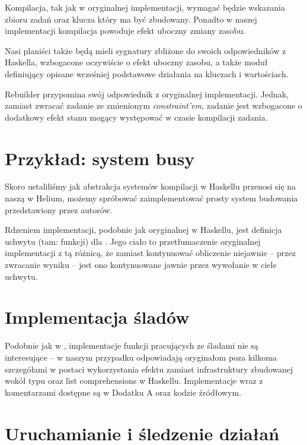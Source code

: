 Kompilacja, tak jak w oryginalnej implementacji, wymagać będzie wskazania zbioru zadań oraz klucza który ma być zbudowany. Ponadto w naszej implementacji kompilacja powoduje efekt uboczny zmiany zasobu.

Nasi planiści także będą mieli sygnatury zbliżone do swoich odpowiedników z Haskella, wzbogacone oczywiście o efekt uboczny zasobu, a także moduł definiujący opisane wcześniej podstawowe działania na kluczach i wartościach.



Rebuilder przypomina swój odpowiednik z oryginalnej implementacji. Jednak, zamiast zwracać zadanie ze zmienionym \textit{constraint'em}, zadanie jest wzbogacone o dodatkowy efekt stanu mogący występować w czasie kompilacji zadania.

\section{Przykład: system busy}

Skoro ustaliliśmy jak abstrakcja systemów kompilacji w Haskellu przenosi się na naszą w Helium, możemy spróbować zaimplementować prosty system budowania  przedstawiony przez autorów.



Rdzeniem implementacji, podobnie jak oryginalnej w Haskellu, jest definicja uchwytu (tam: funkcji) dla . Jego ciało to przetłumaczenie oryginalnej implementacji z tą różnicą, że zamiast kontynuować obliczenie niejawnie -- przez zwracanie wyniku -- jest ono kontynuowane jawnie przez wywołanie  w ciele uchwytu.

\section{Implementacja śladów}

Podobnie jak w \BSaLC{}, implementacje funkcji pracujących ze śladami nie są interesujące -- w naszym przypadku odpowiadają oryginałom poza kilkoma szczegółami w postaci wykorzystania efektu  zamiast infrastruktury zbudowanej wokół typu  oraz list comprehensions w Haskellu. Implementacje wraz z komentarzami dostępne są w Dodatku A oraz kodzie źródłowym.

\section{Uruchamianie i śledzenie działań}

